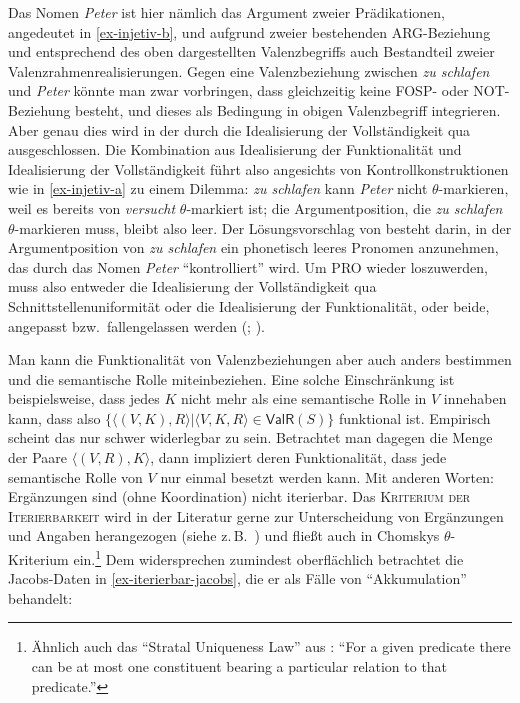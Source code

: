 Das Nomen {\it Peter} ist hier nämlich das Argument zweier Prädikationen, angedeutet in \ref{ex-injetiv-b}, und aufgrund zweier bestehenden ARG-Beziehung und entsprechend des oben dargestellten Valenzbegriffs auch Bestandteil zweier Valenzrahmenrealisierungen. Gegen eine Valenzbeziehung zwischen {\it zu schlafen} und {\it Peter} könnte man zwar vorbringen, dass gleichzeitig keine FOSP- oder NOT-Beziehung besteht, und dieses als Bedingung in obigen Valenzbegriff integrieren. Aber genau dies wird in der  durch die Idealisierung der Vollständigkeit qua  ausgeschlossen. Die Kombination aus Idealisierung der Funktionalität und Idealisierung der Vollständigkeit führt also angesichts von Kontrollkonstruktionen wie in \ref{ex-injetiv-a} zu einem Dilemma: {\it zu schlafen} kann {\it Peter} nicht $\theta$-markieren, weil es bereits von {\it versucht} $\theta$-markiert ist; die Argumentposition, die {\it zu schlafen} $\theta$-markieren muss, bleibt also leer. Der Lösungsvorschlag von \cite{Chomsky:81} besteht darin, in der Argumentposition von {\it zu schlafen} ein phonetisch leeres Pronomen  anzunehmen, das durch das Nomen {\it Peter} "`kontrolliert"' wird. Um PRO wieder loszuwerden, muss also entweder die Idealisierung der Vollständigkeit qua Schnittstellenuniformität oder die Idealisierung der Funktionalität, oder beide, angepasst bzw.\ fallengelassen werden (\citealt{Culicover:Wilkins:86}; \citealt[46, Abschnitt~3.1.1]{Culicover:Jackendoff:06}). 

Man kann die Funktionalität von Valenzbeziehungen aber auch anders bestimmen und die semantische Rolle miteinbeziehen. Eine solche Einschränkung ist beispielsweise, dass jedes $K$ nicht mehr als eine semantische Rolle in $V$ innehaben kann, dass also $\{\langle (V,K), R \rangle | \langle V,K,R \rangle \in \mathsf{ValR}(S) \}$ funktional ist. Empirisch scheint das nur schwer widerlegbar zu sein. Betrachtet man dagegen die Menge der Paare $\langle (V,R),K \rangle$, dann impliziert deren Funktionalität, dass jede semantische Rolle von $V$ nur einmal besetzt werden kann. Mit anderen Worten: Ergänzungen sind (ohne Koordination) nicht iterierbar. Das \textsc{Kriterium der Iterierbarkeit} wird in der Literatur gerne zur Unterscheidung von Ergänzungen und Angaben herangezogen (siehe z.\,B.\ \citealt[22f]{Mueller:10}) und flie\ss t auch in Chomskys $\theta$-Kriterium ein.\footnote{Ähnlich auch das  "`Stratal Uniqueness Law"' aus \citet[255]{Kracht:02}: "`For a given predicate there can be at most one constituent bearing a particular relation to that predicate."'} Dem widersprechen zumindest oberflächlich betrachtet die Jacobs-Daten in \ref{ex-iterierbar-jacobs}, die er als Fälle von "`Akkumulation"' behandelt:

